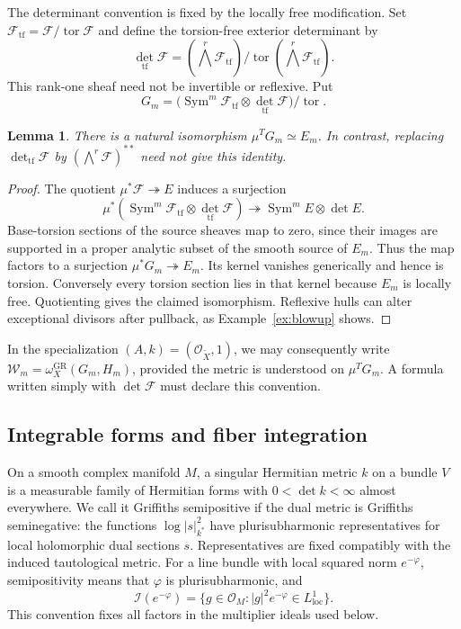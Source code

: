 \documentclass[11pt,reqno]{amsart}
\numberwithin{equation}{section}
\newtheorem{lemma}[theorem]{Lemma}
\theoremstyle{definition}
\theoremstyle{remark}
\newcommand{\OO}{\mathcal O}
\newcommand{\FF}{\mathcal F}
\newcommand{\II}{\mathcal I}
\newcommand{\WW}{\mathcal W}
\newcommand{\Sym}{\operatorname{Sym}}
\newcommand{\Tor}{\operatorname{tor}}
\newcommand{\GR}{\mathrm{GR}}
\newcommand{\tf}{\mathrm{tf}}
\begin{document}
The determinant convention is fixed by the locally free modification. Set $\FF_{\tf}=\FF/\Tor\FF$ and define the torsion-free exterior determinant by
\[
 \det_{\tf}\FF=(\bigwedge^r\FF_{\tf})/\Tor(\bigwedge^r\FF_{\tf}).
\]
This rank-one sheaf need not be invertible or reflexive. Put
\begin{equation}\label{eq:Gm}
 G_m=\bigl(\Sym^m\FF_{\tf}\otimes\det_{\tf}\FF\bigr)/\Tor.
\end{equation}
\begin{lemma}\label{lem:det}
There is a natural isomorphism $\mu^T G_m\simeq E_m$. In contrast, replacing $\det_{\tf}\FF$ by $(\bigwedge^r\FF)^{**}$ need not give this identity.
\end{lemma}
\begin{proof}
The quotient $\mu^*\FF\twoheadrightarrow E$ induces a surjection
\[
 \mu^*(\Sym^m\FF_{\tf}\otimes\det_{\tf}\FF)
       \twoheadrightarrow\Sym^mE\otimes\det E.
\]
Base-torsion sections of the source sheaves map to zero, since their images are supported in a proper analytic subset of the smooth source of $E_m$. Thus the map factors to a surjection $\mu^*G_m\twoheadrightarrow E_m$. Its kernel vanishes generically and hence is torsion. Conversely every torsion section lies in that kernel because $E_m$ is locally free. Quotienting gives the claimed isomorphism. Reflexive hulls can alter exceptional divisors after pullback, as Example~\ref{ex:blowup} shows.
\end{proof}

In the specialization $(A,k)=(\OO_{\widetilde X},1)$, we may consequently write $\WW_m=\omega_X^{\GR}(G_m,H_m)$, provided the metric is understood on $\mu^T G_m$. A formula written simply with $\det\FF$ must declare this convention.

\subsection{Integrable forms and fiber integration}\label{sec:integrability}
On a smooth complex manifold $M$, a singular Hermitian metric $k$ on a bundle $V$ is a measurable family of Hermitian forms with $0<\det k<\infty$ almost everywhere. We call it Griffiths semipositive if the dual metric is Griffiths seminegative: the functions $\log|s|_{k^*}^2$ have plurisubharmonic representatives for local holomorphic dual sections $s$. Representatives are fixed compatibly with the induced tautological metric. For a line bundle with local squared norm $e^{-\varphi}$, semipositivity means that $\varphi$ is plurisubharmonic, and
\[
 \II(e^{-\varphi})=\{g\in\OO_M:|g|^2e^{-\varphi}\in L^1_{\mathrm{loc}}\}.
\]
This convention fixes all factors in the multiplier ideals used below.
\end{document}
